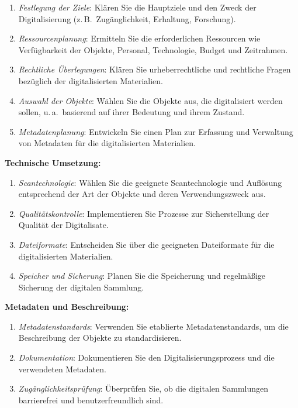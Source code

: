 \documentclass[
  11pt,
  letterpaper,
  DIV=11,
  twoside]{scrreprt}
\begin{document}
\begin{enumerate}
\def\labelenumi{\arabic{enumi}.}
\item
  \emph{Festlegung der Ziele}: Klären Sie die Hauptziele und den Zweck
  der Digitalisierung (z.\,B.~Zugänglichkeit, Erhaltung, Forschung).
\item
  \emph{Ressourcenplanung}: Ermitteln Sie die erforderlichen Ressourcen
  wie Verfügbarkeit der Objekte, Personal, Technologie, Budget und
  Zeitrahmen.
\item
  \emph{Rechtliche Überlegungen}: Klären Sie urheberrechtliche und
  rechtliche Fragen bezüglich der digitalisierten Materialien.
\item
  \emph{Auswahl der Objekte}: Wählen Sie die Objekte aus, die
  digitalisiert werden sollen, u.\,a.~basierend auf ihrer Bedeutung und
  ihrem Zustand.
\item
  \emph{Metadatenplanung}: Entwickeln Sie einen Plan zur Erfassung und
  Verwaltung von Metadaten für die digitalisierten Materialien.
\end{enumerate}

\textbf{Technische Umsetzung:}

\begin{enumerate}
\def\labelenumi{\arabic{enumi}.}
\setcounter{enumi}{5}
\item
  \emph{Scantechnologie}: Wählen Sie die geeignete Scantechnologie und
  Auflösung entsprechend der Art der Objekte und deren Verwendungszweck
  aus.
\item
  \emph{Qualitätskontrolle}: Implementieren Sie Prozesse zur
  Sicherstellung der Qualität der Digitalisate.
\item
  \emph{Dateiformate}: Entscheiden Sie über die geeigneten Dateiformate
  für die digitalisierten Materialien.
\item
  \emph{Speicher und Sicherung}: Planen Sie die Speicherung und
  regelmäßige Sicherung der digitalen Sammlung.
\end{enumerate}

\textbf{Metadaten und Beschreibung:}

\begin{enumerate}
\def\labelenumi{\arabic{enumi}.}
\setcounter{enumi}{9}
\item
  \emph{Metadatenstandards}: Verwenden Sie etablierte
  Metadatenstandards, um die Beschreibung der Objekte zu
  standardisieren.
\item
  \emph{Dokumentation}: Dokumentieren Sie den Digitalisierungsprozess
  und die verwendeten Metadaten.
\item
  \emph{Zugänglichkeitsprüfung}: Überprüfen Sie, ob die digitalen
  Sammlungen barrierefrei und benutzerfreundlich sind.
\end{enumerate}
\end{document}
